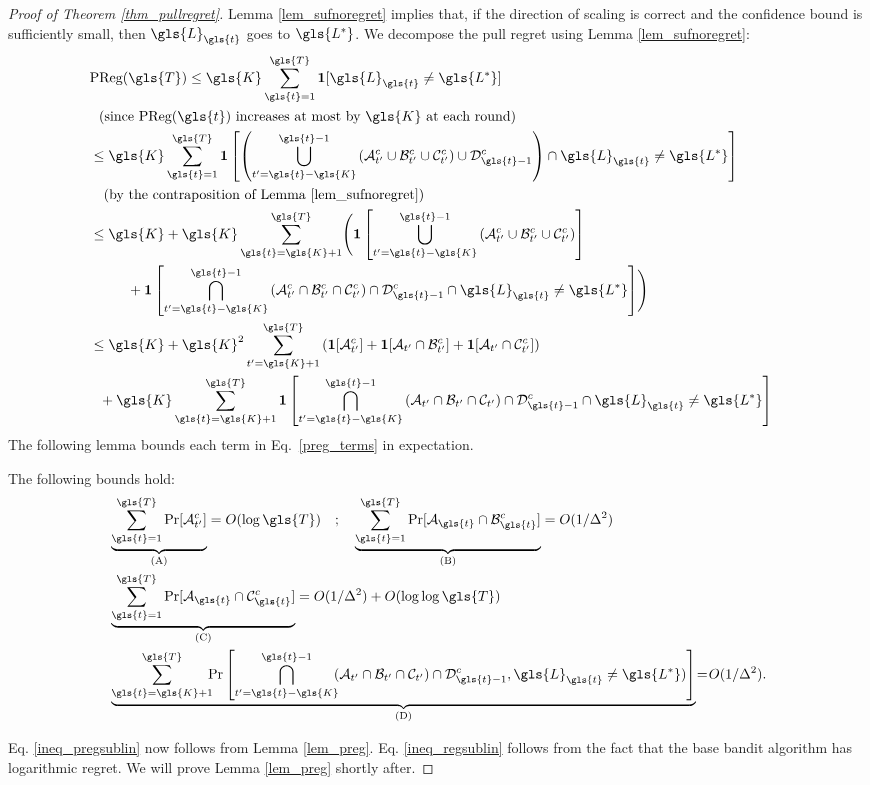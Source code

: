 \begin{proof}[Proof of Theorem \ref{thm_pullregret}]
Lemma \ref{lem_sufnoregret} implies that, if the direction of scaling is correct and the confidence bound is sufficiently small, then $\gls{L}_{\gls{t}}$ goes to $\gls{L^*}$. We decompose the pull regret using Lemma \ref{lem_sufnoregret}:
\begin{align}
\lefteqn{
	\text{PReg}({\gls{T}})  \le \gls{K} \sum_{\gls{t}=1}^{\gls{T}} \Ind[\gls{L}_{\gls{t}} \ne \gls{L^*}]
}\nn
&\ \ \text{(since $\text{PReg}(\gls{t})$ increases at most by $\gls{K}$ at each round)}\nn
&\le \gls{K} \sum_{\gls{t}=1}^{\gls{T}} \Ind\left[\left( \bigcup_{t'=\gls{t}-\gls{K}}^{\gls{t}-1} \left(\mA^c_{t'} \cup \mB^c_{t'} \cup \mC^c_{t'}\right) \cup \mD^c_{\gls{t}-1} \right) \cap \gls{L}_{\gls{t}} \ne \gls{L^*} \right] \nn
&\ \ \text{ (by the contraposition of Lemma \ref{lem_sufnoregret})}\nn
&\le \gls{K} + \gls{K} \sum_{\gls{t}=\gls{K}+1}^{\gls{T}} \Biggl( \Ind\left[\bigcup_{t'=\gls{t}-\gls{K}}^{\gls{t}-1} \left(\mA^c_{t'} \cup \mB^c_{t'} \cup \mC^c_{t'}\right)\right] \nn
&\ \ \ \ \ \ \ \ + \Ind\left[   \bigcap_{t'=\gls{t}-\gls{K}}^{\gls{t}-1} \left(\mA^c_{t'} \cap \mB^c_{t'} \cap\mC^c_{t'}\right) \cap \mD^c_{\gls{t}-1} \cap \gls{L}_{\gls{t}} \ne \gls{L^*} \right] \Biggr)\nn
&\le \gls{K} + \gls{K}^2 \sum_{t'=\gls{K}+1}^{\gls{T}} \left( \Ind[\mA^c_{t'}] + \Ind[\mA_{t'} \cap \mB^c_{t'}] + \Ind[\mA_{t'} \cap\mC^c_{t'}] \right) \nn
&\ \ + \gls{K} \sum_{\gls{t}=\gls{K}+1}^{\gls{T}} \Ind\left[ \bigcap_{t'=\gls{t}-\gls{K}}^{\gls{t}-1} \left(\mA_{t'} \cap \mB_{t'} \cap\mC_{t'}\right) \cap \mD^c_{\gls{t}-1} \cap \gls{L}_{\gls{t}} \ne \gls{L^*} \right] \label{preg_terms}
\end{align}
The following lemma bounds each term in Eq.\ \eqref{preg_terms} in expectation.

\begin{lemma} \label{lem_preg}
	The following bounds hold:
	\begin{align*}
	& \underbrace{\sum_{\gls{t}=1}^{\gls{T}} \Pr[\mA^c_{t'}]}_{\mathrm{(A)}} = O(\log \gls{T})  \quad;\quad \underbrace{\sum_{\gls{t}=1}^{\gls{T}} \Pr[\mA_{\gls{t}} \cap \mB^c_{\gls{t}}]}_{\mathrm{(B)}} = O(1/\Delta^2) \nn
	& \underbrace{\sum_{\gls{t}=1}^{\gls{T}} \Pr[\mA_{\gls{t}} \cap \mC^c_{\gls{t}}]}_{\mathrm{(C)}} = O(1/\Delta^2) + O(\log\log \gls{T}) \nn
	& \underbrace{\sum_{\gls{t}=\gls{K}+1}^{\gls{T}} \hspace{-0.5em}\Pr\left[ \bigcap_{t'=\gls{t}-\gls{K}}^{\gls{t}-1}\hspace{-0.5em} \left(\mA_{t'} \cap \mB_{t'}  \cap \mC_{t'}\right) \cap \mD^c_{\gls{t}-1}, \gls{L}_{\gls{t}} \ne \gls{L^*})\right]}_{\mathrm{(D)}}\hspace{-0.2em} =\hspace{-0.2em} O(1/\Delta^2). 
	\end{align*}
\end{lemma} 

Eq. \eqref{ineq_pregsublin} now follows from Lemma \ref{lem_preg}. Eq. \eqref{ineq_regsublin} follows from the fact that the base bandit algorithm has logarithmic regret. We will prove Lemma \ref{lem_preg} shortly after.
\end{proof}

